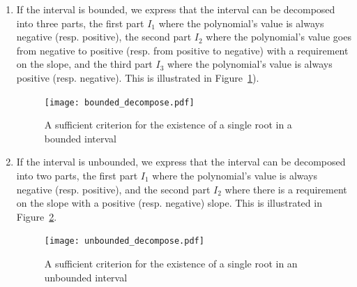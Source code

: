 \documentclass{mscs}
\begin{document}
\begin{enumerate}
\item If the interval is bounded, we express that the interval can be
  decomposed into three parts, the first part \(I_1\) where the polynomial's
  value is always negative (resp. positive),
  the second part \(I_2\) where the polynomial's
  value goes from negative to positive (resp. from positive to
  negative) with a requirement on the
  slope, and the third
  part \(I_3\) where the polynomial's value is always
  positive (resp. negative).  This is illustrated in Figure~\ref{bounded_decompose}).
\begin{figure}[h]
\begin{center}
\texttt{[image: bounded\_decompose.pdf]}
\end{center}
\caption{\label{bounded_decompose} A sufficient criterion for the existence of a single root in a bounded interval}
\end{figure}
\item If the interval is unbounded, we express that the interval can
  be decomposed into two parts, the first part \(I_1\) where the polynomial's
  value is always negative (resp. positive), and the second part \(I_2\)
  where there is a requirement on the slope with a positive
  (resp. negative) slope.  This is illustrated in Figure~\ref{unbounded_decompose}.
\begin{figure}[h]
\begin{center}
\texttt{[image: unbounded\_decompose.pdf]}
\end{center}
\caption{\label{unbounded_decompose} A sufficient criterion for the existence of a single root in an unbounded interval}
\end{figure}
\end{enumerate}
\end{document}
